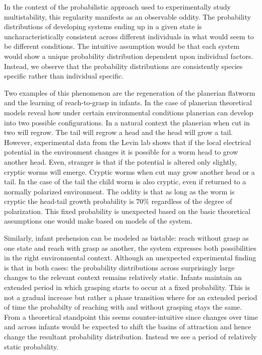 \documentclass[letterpaper]{article}
\begin{document}
In the context of the probabilistic approach used to experimentally 
study multistability, this regularity manifests as an observable oddity.
The probability distributions of developing systems ending up in a given
state is uncharacteristically consistent across different individuals 
in what would seem to be different conditions. The intuitive assumption
would be that each system would show a unique probability distribution
dependent upon individual factors. Instead, we observe that the probability
distributions are consistently species specific rather than individual specific.

Two examples of this phenomenon are the regeneration of the planerian flatworm
and the learning of reach-to-grasp in infants. In the case of planerian
theoretical models reveal how under certain environmental conditions 
planerian can develop into two possible configurations. In a natural context
the planerian when cut in two will regrow. The tail will regrow a head and the
head will grow a tail. However, experimental data from the Levin lab shows that
if the local electrical potential in the environment changes it is possible for 
a worm head to grow another head. Even, stranger is that if the potential
is altered only slightly, cryptic worms will emerge. Cryptic worms when cut 
may grow another head or a tail. In the case of the tail the child worm is 
also cryptic, even if returned to a normally polarized environment. The oddity
is that as long as the worm is cryptic the head-tail growth probability is $70\%$
regardless of the degree of polarization. This fixed probability is unexpected 
based on the basic theoretical assumptions one would make based on models of the
system.

Similarly, infant
prehension can be modeled as bistable: reach without grasp as one state
and reach with grasp as another, the system expresses both possibilities in the right
environmental context. Although an unexpected experimental finding is that in
both cases: the probability distributions across surprisingly large changes
to the relevant context remains relatively static. Infants maintain an extended 
period in which grasping starts to occur at a fixed probability. This is not a gradual
increase but rather a phase transition where for an extended period of time the probabilty
of reaching with and without grasping stays the same.
From a theoretical standpoint this seems 
counter-intuitive since changes over time and across infants would be expected 
to shift the basins of attraction and hence change the resultant probability 
distribution. Instead we see a period of relatively static probability.
\end{document}
